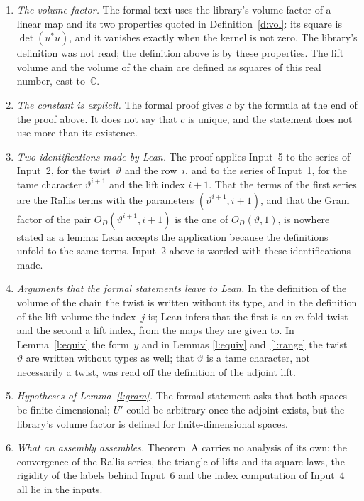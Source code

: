 \documentclass[11pt,a4paper]{article}
\newcommand{\m}[1]{\mbox{$#1$}}        %
\theoremstyle{plainx}
\theoremstyle{uprightx}
\newcommand{\CC}{\mathbb{C}}
\begin{document}
\begin{enumerate}[label=\textup{\arabic*.},leftmargin=1.6em,itemsep=5pt]
\item \emph{The volume factor.} The formal text uses the library's volume factor of a linear map and its two
properties quoted in Definition~\ref{d:vol}: its square is \m{\det(u^{*}u)}, and it vanishes exactly when the
kernel is not zero. The library's definition was not read; the definition above is by these properties. The lift
volume and the volume of the chain are defined as squares of this real number, cast to~$\CC$.
\item \emph{The constant is explicit.} The formal proof gives $c$ by the formula at the end of the proof above. It
does not say that $c$ is unique, and the statement does not use more than its existence.
\item \emph{Two identifications made by Lean.} The proof applies Input~5 to the series of Input~2, for the
twist~$\vartheta$ and the row~$i$, and to the series of Input~1, for the tame character \m{\vartheta^{i+1}} and
the lift index \m{i+1}. That the terms of the first series are the Rallis terms with the parameters
\m{(\vartheta^{i+1},i+1)}, and that the Gram factor of the pair \m{O_D(\vartheta^{i+1},i+1)} is the one of
\m{O_D(\vartheta,1)}, is nowhere stated as a lemma: Lean accepts the application because the definitions unfold
to the same terms. Input~2 above is worded with these identifications made.
\item \emph{Arguments that the formal statements leave to Lean.} In the definition of the volume of the chain the
twist is written without its type, and in the definition of the lift volume the index~$j$ is; Lean infers that
the first is an $m$-fold twist and the second a lift index, from the maps they are given to. In
Lemma~\ref{l:equiv} the form~$y$ and in Lemmas \ref{l:equiv} and~\ref{l:range} the twist~$\vartheta$ are written
without types as well; that $\vartheta$ is a tame character, not necessarily a twist, was read off the definition
of the adjoint lift.
\item \emph{Hypotheses of Lemma~\ref{l:gram}.} The formal statement asks that both spaces be finite-dimensional;
$U'$ could be arbitrary once the adjoint exists, but the library's volume factor is defined for finite-dimensional
spaces.
\item \emph{What an assembly assembles.} Theorem~A carries no analysis of its own: the convergence of the Rallis
series, the triangle of lifts and its square laws, the rigidity of the labels behind Input~6 and the index
computation of Input~4 all lie in the inputs.
\end{enumerate}
\end{document}
